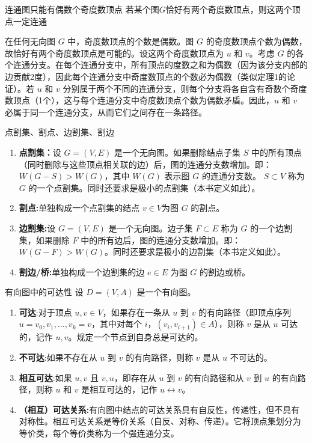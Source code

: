 \begin{theorem}{连通图只能有偶数个奇度数顶点}{}
若某个图$G$恰好有两个奇度数顶点，则这两个顶点一定连通
\end{theorem}
在任何无向图 $G$ 中，奇度数顶点的个数是偶数。图 $G$ 的奇度数顶点个数为偶数，故恰好有两个奇度数顶点是可能的。设这两个奇度数顶点为 $u$ 和 $v$。考虑 $G$ 的各个连通分支。在每个连通分支中，所有顶点的度数之和为偶数（因为该分支内部的边贡献2度），因此每个连通分支中奇度数顶点的个数必为偶数（类似定理1的论证）。若 $u$ 和 $v$ 分别属于两个不同的连通分支，则每个分支将各自含有奇数个奇度数顶点（1个），这与每个连通分支中奇度数顶点个数为偶数矛盾。因此，$u$ 和 $v$ 必属于同一个连通分支，从而它们之间存在一条路径。
\begin{definition}{点割集、割点、边割集、割边}{}
\begin{enumerate}
    \item\textbf{点割集：}设 $G = (V, E)$ 是一个无向图。如果删除结点子集 $S$ 中的所有顶点（同时删除与这些顶点相关联的边）后，图的连通分支数增加。即：$W(G - S) > W(G)$，其中 $W(G)$ 表示图 $G$ 的连通分支数。 $S \subset V$ 称为 $G$ 的一个点割集。同时还要求是极小的点割集（本书定义如此）。
    \item \textbf{割点:}单独构成一个点割集的结点 $v \in V$为图 $G$ 的割点。
    \item \textbf{边割集:}设 $G = (V, E)$ 是一个无向图。边子集 $F \subset E$ 称为 $G$ 的一个边割集，如果删除 $F$ 中的所有边后，图的连通分支数增加。即：$W(G - F) > W(G)$。同时还要求是极小的边割集（本书定义如此）。
\item\textbf{割边/桥:}单独构成一个边割集的边 $e\in E$ 为图 $G$ 的割边或桥。
\end{enumerate}
\end{definition}
\begin{definition}{有向图中的可达性}{}
设 $D = (V, A)$ 是一个有向图。
\begin{enumerate}
\item\textbf{可达}:对于顶点 $u, v \in V$，如果存在一条从 $u$ 到 $v$ 的有向路径（即顶点序列 $u = v_0, v_1, \ldots, v_k = v$，其中对每个 $i$，$(v_i, v_{i+1}) \in A$），则称 $v$ 是从 $u$ 可达的，记作 $u , v$。规定一个节点到自身总是可达的。
\item\textbf{不可达}:如果不存在从 $u$ 到 $v$ 的有向路径，则称 $v$ 是从 $u$ 不可达的。
\item\textbf{相互可达}:如果 $u , v$ 且 $v , u$，即存在从 $u$ 到 $v$ 的有向路径和从 $v$ 到 $u$ 的有向路径，则称 $u$ 和 $v$ 是相互可达的，记作 $u \leftrightarrow v$。
\item\textbf{（相互）可达关系:}有向图中结点的可达关系具有自反性，传递性，但不具有对称性。相互可达关系是等价关系（自反、对称、传递）。它将顶点集划分为等价类，每个等价类称为一个强连通分支。
\end{enumerate}
\end{definition}
